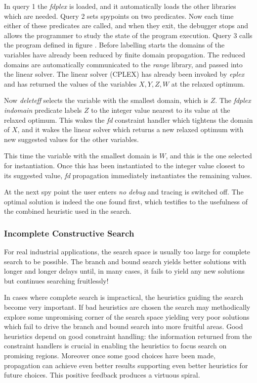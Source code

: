 \documentclass[a4wide]{article}
\begin{document}
In query 1 the {\em fdplex} is loaded, and it automatically loads the
other libraries which are needed.
Query 2 sets spypoints on two predicates.  Now each time either of
these predicates are called, and when they exit, the debugger stops
and allows the programmer to study the state of the program execution.
Query 3 calls the program defined in figure \pageref{fdplexsearch}.
Before labelling starts the domains of the variables have already been
reduced by finite domain propagation.
The reduced domains are automatically communicated to the {\em range}
library, and passed into the linear solver.
The linear solver (CPLEX) has already been invoked by {\em eplex} and
has returned the values of the variables $X,Y,Z,W$ at the relaxed
optimum.

Now {\em deleteff} selects the variable with the smallest
domain, which is $Z$.
The {\em fdplex indomain} predicate labels $Z$ to the integer value
nearest to its value at 
the relaxed optimum.
This wakes the {\em fd} constraint handler which tightens the domain
of $X$, and it wakes the linear solver which returns a new relaxed
optimum with new suggested values for the other variables. 

This time the variable with the smallest domain is $W$, and this is
the one selected for instantiation.
Once this has been instantiated to the integer value closest to its
suggested value, {\em fd} propagation immediately instantiates the
remaining values.

At the next spy point the user enters {\em no debug} and tracing is
switched off.
The optimal solution is indeed the one found first, which testifies to
the usefulness of the combined heuristic used in the search.

\subsubsection{Incomplete Constructive Search}
For real industrial applications, the search space is usually too large
for complete search to be possible.
The branch and bound search yields better solutions with longer and
longer delays until, in many cases, it fails to yield any new
solutions but continues searching fruitlessly!

In cases where complete search is impractical, the heuristics guiding
the search become very important.
If bad heuristics are chosen the search may methodically explore some
unpromising corner of the search space yielding very poor solutions
which fail to drive the branch and bound search into more fruitful
areas. 
Good heuristics depend on good constraint handling: the information
returned from the constraint handlers is crucial in enabling the
heuristics to focus  search
on promising regions.
Moreover once some good choices have been made, propagation can
achieve even better results supporting even better heuristics for
future choices.
This positive feedback produces  a virtuous spiral.
\end{document}
